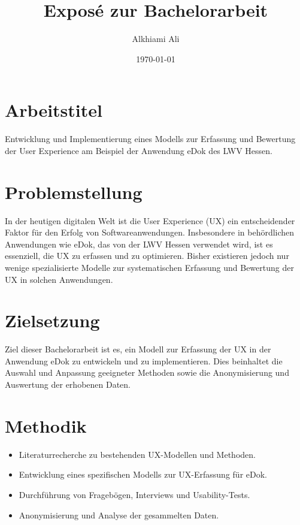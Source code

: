 \documentclass[a4paper,12pt]{report}
\title{Exposé zur Bachelorarbeit}
\author{Alkhiami Ali}
\date{\today}
\begin{document}
\maketitle

\section*{Arbeitstitel}
Entwicklung und Implementierung eines Modells zur Erfassung und Bewertung der User Experience am Beispiel der Anwendung eDok des LWV Hessen.

\section*{Problemstellung}
In der heutigen digitalen Welt ist die User Experience (UX) ein entscheidender Faktor für den Erfolg von Softwareanwendungen. Insbesondere in behördlichen Anwendungen wie eDok, das von der LWV Hessen verwendet wird, ist es essenziell, die UX zu erfassen und zu optimieren. Bisher existieren jedoch nur wenige spezialisierte Modelle zur systematischen Erfassung und Bewertung der UX in solchen Anwendungen.

\section*{Zielsetzung}
Ziel dieser Bachelorarbeit ist es, ein Modell zur Erfassung der UX in der Anwendung eDok zu entwickeln und zu implementieren. Dies beinhaltet die Auswahl und Anpassung geeigneter Methoden sowie die Anonymisierung und Auswertung der erhobenen Daten.

\section*{Methodik}
\begin{itemize}
    \item Literaturrecherche zu bestehenden UX-Modellen und Methoden.
    \item Entwicklung eines spezifischen Modells zur UX-Erfassung für eDok.
    \item Durchführung von Fragebögen, Interviews und Usability-Tests.
    \item Anonymisierung und Analyse der gesammelten Daten.
\end{itemize}
\end{document}
